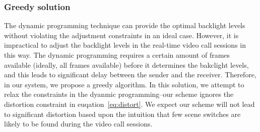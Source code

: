 

\subsubsection{Greedy solution}
\label{sec:greedy}
The dynamic programming technique can provide the optimal
backlight levels without violating the adjustment constraints in an
ideal case. However, 
it is impractical to adjust the backlight levels in the real-time
video call sessions in
this way. The dynamic programming requires a certain amount of frames
available (ideally, all frames available) before
it determines the bakclight levels, and this leads to significant
delay between the sender and the receiver. 
Therefore, in our system, we propose a greedy algorithm. In this solution,
we attempt to relax the constraints in the dyanmic
programming--our scheme ignores the distortion constraint in
euqation~\ref{eq:distort}. We expect our scheme will not lead to significant
 distortion based upon the intuition that few scene switches are
likely to be found during the video call sessions. 


